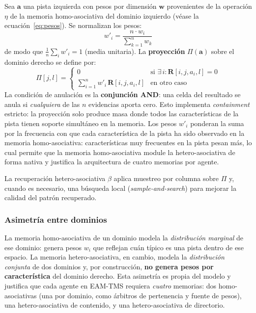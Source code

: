 Sea $\mathbf{a}$ una pista izquierda con pesos por dimensión $\mathbf{w}$ provenientes de
la operación $\eta$ de la memoria homo-asociativa del dominio izquierdo
(véase la ecuación~\eqref{eq:pesos}).
Se normalizan los pesos:
\begin{equation}
    w'_i = \frac{n \cdot w_i}{\displaystyle\sum_{k=1}^{n} w_k}
    \label{eq:normalizacion-pesos}
\end{equation}
de modo que $\frac{1}{n}\sum_i w'_i = 1$ (media unitaria).
La \textbf{proyección} $\Pi(\mathbf{a})$ sobre el dominio derecho se define por:
\begin{equation}
    \Pi[j, l] = \begin{cases}
        0 & \text{si } \exists\, i : \mathbf{R}[i, j, a_i, l] = 0 \\[4pt]
        \displaystyle\sum_{i=1}^{n} w'_i\, \mathbf{R}[i, j, a_i, l] & \text{en otro caso}
    \end{cases}
    \label{eq:proyeccion-AND}
\end{equation}
La condición de anulación es la \textbf{conjunción AND}: una celda del resultado se
anula si \emph{cualquiera} de las $n$ evidencias aporta cero.
Esto implementa \emph{containment} estricto: la proyección solo produce masa donde
todos las características de la pista tienen soporte simultáneo en la memoria.
Los pesos $w'_i$ ponderan la suma por la frecuencia con que cada característica de la pista
ha sido observado en la memoria homo-asociativa: características muy frecuentes en la pista
pesan más, lo cual permite que la memoria homo-asociativa module la hetero-asociativa
de forma nativa y justifica la arquitectura de cuatro memorias por agente.

La recuperación hetero-asociativa $\beta$ aplica muestreo por columna sobre $\Pi$ y,
cuando es necesario, una búsqueda local (\emph{sample-and-search}) para mejorar la
calidad del patrón recuperado.

\subsubsection*{Asimetría entre dominios}

La memoria homo-asociativa de un dominio modela la \emph{distribución marginal} de ese
dominio: genera pesos $w_i$ que reflejan cuán típico es una pista dentro de ese espacio.
La memoria hetero-asociativa, en cambio, modela la \emph{distribución conjunta} de dos
dominios y, por construcción, \textbf{no genera pesos por característica} del dominio derecho.
Esta asimetría es propia del modelo y justifica que cada agente en EAM-TMS requiera
\emph{cuatro} memorias: dos homo-asociativas (una por dominio, como
árbitros de pertenencia y fuente de pesos), una hetero-asociativa de contenido, y
una hetero-asociativa de directorio.

